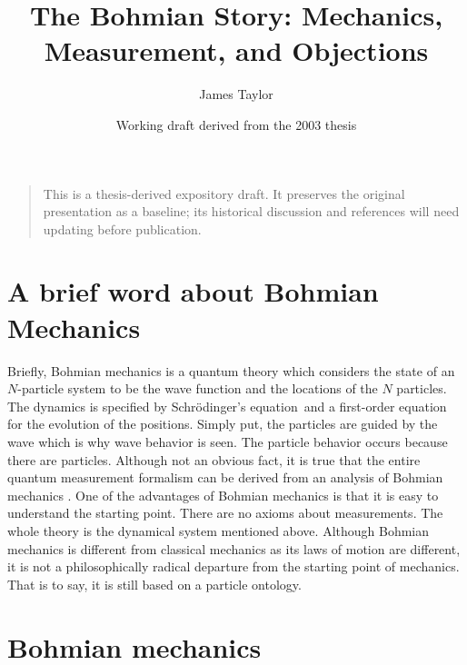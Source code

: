 \documentclass[11pt]{article}
\title{The Bohmian Story: Mechanics, Measurement, and Objections}
\author{James Taylor}
\date{Working draft derived from the 2003 thesis}
\theoremstyle{remark}
\begin{document}
\maketitle

\begin{quote}\small This is a thesis-derived expository draft. It preserves the original presentation as a baseline; its historical discussion and references will need updating before publication.\end{quote}

\section{A brief word about Bohmian Mechanics}


Briefly, Bohmian mechanics is a quantum theory which considers the
state of an $N$-particle system to be the wave function and the
locations of the $N$ particles. The dynamics is specified by Schr\"odinger's equation\ and
a first-order equation for the evolution of the positions. Simply put,
the particles are guided by the wave which is why wave behavior is
seen. The particle behavior occurs because there are
particles. Although not an obvious fact, it is true that the 
 entire quantum measurement formalism
can be derived from an analysis of Bohmian mechanics \cite{DGZ92, DGZ03}.
 One of the advantages of 
 Bohmian mechanics is that it is easy to understand the starting
point. There are no axioms about measurements. The whole theory is the
dynamical system mentioned above. Although Bohmian mechanics is
different from classical mechanics as its laws of motion are
different, it is not a philosophically radical departure from the
starting point of mechanics. That is to say, it is still based on a particle
ontology.

\clearpage

\section{Bohmian mechanics} \label{s:sim}
\end{document}
